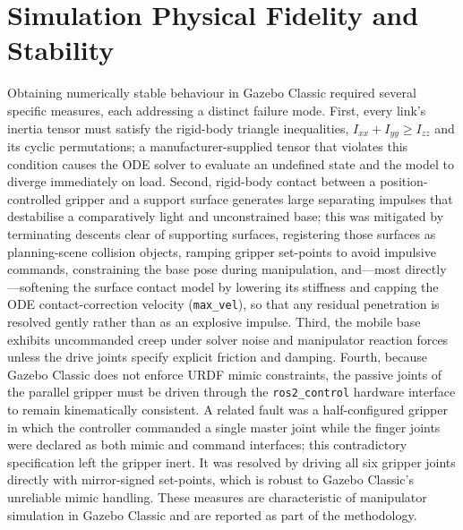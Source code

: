 \section{Simulation Physical Fidelity and Stability}
Obtaining numerically stable behaviour in Gazebo Classic required several specific
measures, each addressing a distinct failure mode. First, every link's inertia tensor
must satisfy the rigid-body triangle inequalities, $I_{xx}+I_{yy}\ge I_{zz}$ and its
cyclic permutations; a manufacturer-supplied tensor that violates this condition causes
the ODE solver to evaluate an undefined state and the model to diverge immediately on
load. Second, rigid-body contact between a position-controlled gripper and a support
surface generates large separating impulses that destabilise a comparatively light and
unconstrained base; this was mitigated by terminating descents clear of supporting
surfaces, registering those surfaces as planning-scene collision objects, ramping
gripper set-points to avoid impulsive commands, constraining the base pose during
manipulation, and---most directly---softening the surface contact model by lowering its
stiffness and capping the ODE contact-correction velocity (\texttt{max\_vel}), so that
any residual penetration is resolved gently rather than as an explosive impulse. Third,
the mobile base exhibits uncommanded creep under solver noise and
manipulator reaction forces unless the drive joints specify explicit friction and
damping. Fourth, because Gazebo Classic does not enforce URDF mimic constraints, the
passive joints of the parallel gripper must be driven through the \texttt{ros2\_control}
hardware interface to remain kinematically consistent. A related fault was a
half-configured gripper in which the controller commanded a single master joint while
the finger joints were declared as both mimic and command interfaces; this contradictory
specification left the gripper inert. It was resolved by driving all six gripper joints
directly with mirror-signed set-points, which is robust to Gazebo Classic's unreliable
mimic handling. These measures are characteristic of manipulator simulation in Gazebo
Classic and are reported as part of the methodology.

